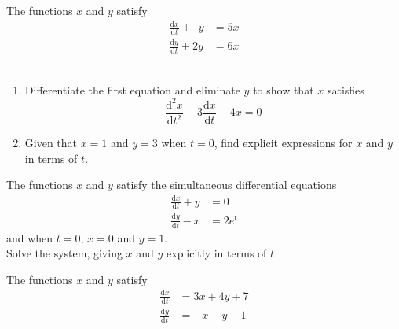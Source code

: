 \documentclass[leqno]{article}
\begin{document}
\djsFrontMatter
\begin{enumerate}[
  label=\textbf{\arabic*.},
  leftmargin=*,
  topsep=0pt,
  partopsep=0pt,
  parsep=0pt
]

\questionitem

The functions $x$ and $y$ satisfy
\begin{align*}
\frac{\mathrm{d}x}{\mathrm{d}t}+\,\,\,y&=5x\\[5pt]
\frac{\mathrm{d}y}{\mathrm{d}t}+2y&=6x
\end{align*} \\
\begin{enumerate}[label=\textbf{(\alph*)}]
  \item Differentiate the first equation and eliminate $y$ to show that $x$ satisfies\\
  \[
  \frac{\mathrm{d}^2 x}{\mathrm{d}t^2}-3\frac{\mathrm{d}x}{\mathrm{d}t}-4x=0
  \]
  \item Given that $x=1$ and $y=3$ when $t=0$, find explicit expressions for $x$ and $y$ in terms of $t$.  \\
\end{enumerate}

\newpage

\questionitem

The functions $x$ and $y$ satisfy the simultaneous differential equations \\
\begin{align*}
\frac{\mathrm{d}x}{\mathrm{d}t}+y&=0\\[5pt]
\frac{\mathrm{d}y}{\mathrm{d}t}-x&=2e^{t}
\end{align*}
and when $t=0$, $x=0$ and $y=1$. \\

Solve the system, giving $x$ and $y$ explicitly in terms of $t$  \\

\newpage

\questionitem

The functions $x$ and $y$ satisfy \\
\[
\begin{aligned}
\frac{\mathrm{d}x}{\mathrm{d}t} &= 3x+4y+7 \\[5pt]
\frac{\mathrm{d}y}{\mathrm{d}t} &= -x-y-1
\end{aligned}
\] \\


\end{enumerate}
\end{document}
